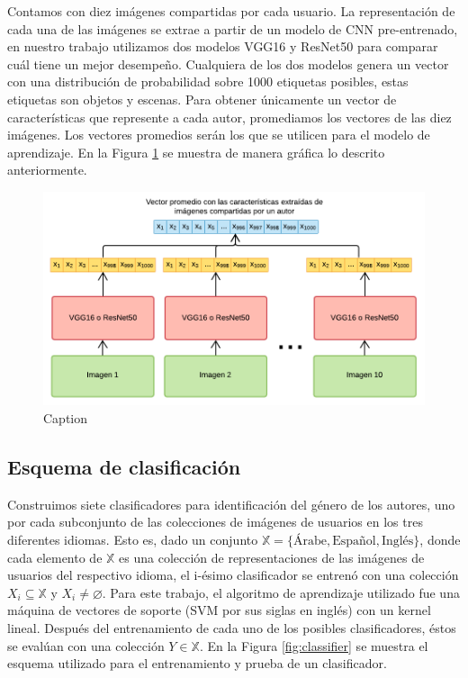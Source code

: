 \documentclass[runningheads]{llncs}
\begin{document}
Contamos con diez imágenes compartidas por cada usuario. La representación
de cada una de las imágenes se extrae a partir de un modelo de CNN
pre-entrenado, en nuestro trabajo utilizamos dos modelos VGG16 y ResNet50 para
comparar cuál tiene un mejor desempeño.
Cualquiera de los dos modelos genera un vector con una distribución 
de probabilidad sobre 1000 etiquetas posibles, estas etiquetas son objetos 
y escenas. Para obtener únicamente un vector de características que represente
a cada autor, promediamos los vectores de las diez imágenes. Los vectores
promedios serán los que se utilicen para el modelo de aprendizaje. En la Figura 
\ref{fig:img_representation} se muestra de manera gráfica lo descrito anteriormente.


\begin{figure}
    \centering
    \includegraphics[scale=0.3]{img/features_extraction.png}
    \caption{Caption}
    \label{fig:img_representation}
\end{figure}


\subsection{Esquema de clasificación}

Construimos siete clasificadores para identificación del género de los autores, uno por 
cada subconjunto de las colecciones de imágenes de usuarios en los tres diferentes 
idiomas. Esto es, dado un conjunto $\mathbb{X} = \{\text{Árabe}, \text{Español}, \text{Inglés}\}$, donde cada elemento de $\mathbb{X}$ es una colección de 
representaciones de las imágenes de 
usuarios del respectivo idioma, el i-ésimo clasificador se entrenó con una colección 
$X_i \subseteq \mathbb{X}$ y $X_i \neq \varnothing$. Para este trabajo,
el algoritmo de aprendizaje utilizado fue una máquina de vectores de soporte (SVM por 
sus siglas en inglés) con un kernel lineal. Después del entrenamiento 
de cada uno de los posibles clasificadores, éstos se evalúan con una colección $Y \in \mathbb{X}$. En la Figura \ref{fig:classifier} se muestra el esquema utilizado
para el entrenamiento y prueba de un clasificador.
\end{document}

